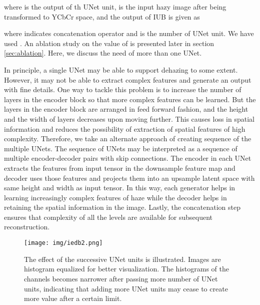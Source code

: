 \documentclass[runningheads]{llncs}
\begin{document}
\noindent where  is the output of th UNet unit,  is the input hazy image after being transformed to YCbCr space, and the output  of IUB is given as 

where  indicates concatenation operator and  is the number of UNet unit. We have used . An ablation study on the value of  is presented later in section \ref{sec:ablation}. Here, we discuss the need of more than one UNet.

In principle, a single UNet may be able to support dehazing to some extent. However, it may not be able to extract complex features and generate an output with fine details. One way to tackle this problem is to increase the number of layers in the encoder block so that more complex features can be learned. But the layers in the encoder block are arranged in feed forward fashion, and the height and the width of layers decreases upon moving further. This causes loss in spatial information and reduces the possibility of extraction of spatial features of high complexity. Therefore, we take an alternate approach of creating sequence of the multiple UNets. The sequence of UNets may be interpreted as a sequence of multiple encoder-decoder pairs with skip connections. The encoder in each UNet extracts the features from input tensor in the downsample feature map and decoder uses those features and projects them into an upsample latent space with same height and width as input tensor. In this way, each generator helps in learning increasingly complex features of haze while the decoder helps in retaining the spatial information in the image. Lastly, the concatenation step ensures that complexity of all the levels are available for subsequent reconstruction.

\begin{figure*}[t]
\centering
\texttt{[image: img/iedb2.png]}
\caption{The effect of the successive UNet units is illustrated. Images are histogram equalized for better visualization. The histograms of the channels becomes narrower after passing more number of UNet units, indicating that adding more UNet units may cease to create more value after a certain limit.}
\label{img:iedb}
\end{figure*}
\end{document}
